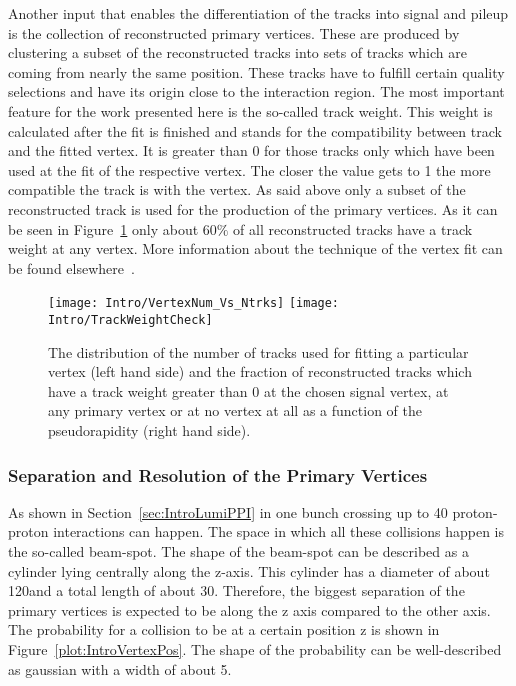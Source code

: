 Another input that enables the differentiation of the tracks into signal and pileup is the collection of reconstructed primary vertices. These are produced by clustering a subset of the reconstructed tracks into sets of tracks which are coming from nearly the same position. These tracks have to fulfill certain quality selections and have its origin close to the interaction region. The most important feature for the work presented here is the so-called track weight. This weight is calculated after the fit is finished and stands for the compatibility between track and the fitted vertex. It is greater than 0 for those tracks only which have been used at the fit of the respective vertex. The closer the value gets to 1 the more compatible the track is with the vertex. As said above only a subset of the reconstructed track is used for the production of the primary vertices. As it can be seen in Figure~\ref{plot:IntroTrackWeight} only about $60\%$ of all reconstructed tracks have a track weight at any vertex.  More information about the technique of the vertex fit can be found elsewhere~\cite{CMS-PAPER-TRK-11-001}.

\begin{figure}[!Hhtb]
  \centering
  \texttt{[image: Intro/VertexNum\_Vs\_Ntrks]}
  \texttt{[image: Intro/TrackWeightCheck]}
  \caption[Distribution of number of tracks used for fitting the vertices and fraction of reconstructed tracks which have a track weight at any primary vertex]{The distribution of the number of tracks used for fitting a particular vertex (left hand side) and the fraction of reconstructed tracks which have a track weight greater than 0 at the chosen signal vertex, at any primary vertex or at no vertex at all as a function of the pseudorapidity (right hand side). \label{plot:IntroTrackWeight}}
\end{figure}

\subsubsection{Separation and Resolution of the Primary Vertices\label{sec:IntroSepResPV}}

As shown in Section~\ref{sec:IntroLumiPPI} in one bunch crossing up to 40 proton-proton interactions can happen. The space in which all these collisions happen is the so-called beam-spot. The shape of the beam-spot can be described as a cylinder lying centrally along the z-axis. This cylinder has a diameter of about 120\mum and a total length of about 30\cm. Therefore, the biggest separation of the primary vertices is expected to be along the z axis compared to the other axis. The probability for a collision to be at a certain position z is shown in Figure~\ref{plot:IntroVertexPos}. The shape of the probability can be well-described as gaussian with a width of about 5\cm. 

